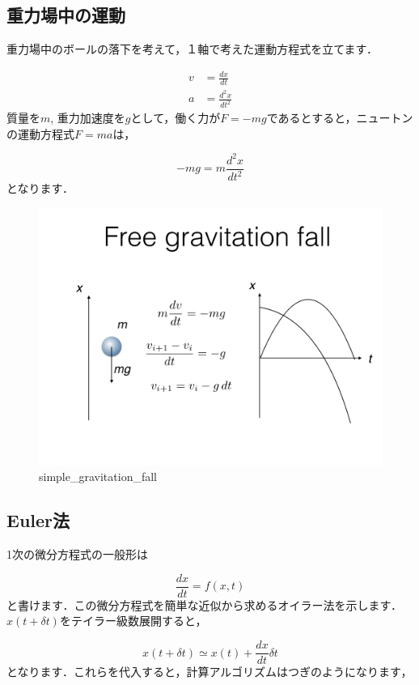 \documentclass[11pt,dvipdfmx]{jsarticle}
\makeatletter
\def\maxwidth{\ifdim\Gin@nat@width>\linewidth\linewidth
    \else\Gin@nat@width\fi}
\let\Oldincludegraphics\includegraphics
\renewcommand{\includegraphics}[1]{\Oldincludegraphics[width=.8\maxwidth]{#1}}
\makeatother
\begin{document}
\subsection{重力場中の運動}\label{ux91cdux529bux5834ux4e2dux306eux904bux52d5}

重力場中のボールの落下を考えて，１軸で考えた運動方程式を立てます．

\[
\begin{aligned}
v &= \frac{dx}{dt} \\
a &= \frac{d^2 x}{dt^2}
\end{aligned}
\] 質量を\(m\),
重力加速度を\(g\)として，働く力が\(F=-mg\)であるとすると，ニュートンの運動方程式\(F=ma\)は，

\[ 
-mg = m \frac{d^2 x}{dt^2}
\] となります．

\begin{figure}[htbp]
\centering
\includegraphics{../figs/ode.002.jpeg}
\caption{simple\_gravitation\_fall}
\end{figure}

    \subsection{Euler法}\label{eulerux6cd5}

    1次の微分方程式の一般形は

\[
\frac{dx}{dt}=f(x,t)
\]
と書けます．この微分方程式を簡単な近似から求めるオイラー法を示します．
\(x(t+\delta t)\)をテイラー級数展開すると，

\[
x(t+\delta t) \simeq x(t) + \frac{dx}{dt} \delta t
\]
となります．これらを代入すると，計算アルゴリズムはつぎのようになります，
\end{document}
